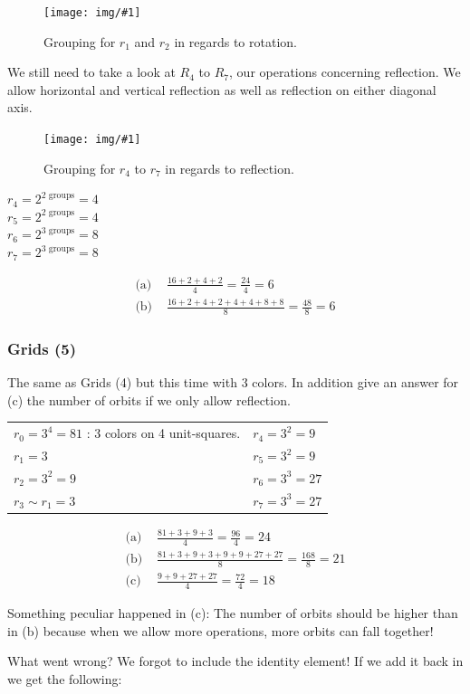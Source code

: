 \documentclass[12pt,onecolumn%
]{scrartcl}
\newcommand{\img}[3]{
\begin{figure}[H]
	\centering
	\texttt{[image: img/\#1]}
	\captionsetup{width=0.8\textwidth, justification=centering}
	\caption{#3}
\end{figure}
}
\newcommand{\eq}[1]{
\begin{equation*}
\begin{aligned}
#1
\end{aligned}
\end{equation*}
}
\begin{document}
{\img{block_2x2_groups_rot}{trim=140 530 245 130, clip}{Grouping for $r_1$ and $r_2$ in regards to rotation.}

We still need to take a look at $R_4$ to $R_7$, our operations concerning reflection. We allow horizontal and vertical reflection as well as reflection on either diagonal axis.

\img{block_2x2_groups_ref}{trim=140 440 235 120, clip}{Grouping for $r_4$ to $r_7$ in regards to reflection.}

$r_4 = 2^{2 \text{ groups}} = 4$ \\
$r_5 = 2^{2 \text{ groups}} = 4$ \\
$r_6 = 2^{3 \text{ groups}} = 8$ \\
$r_7 = 2^{3 \text{ groups}} = 8$

\eq{
	\text{(a) }& \frac{16+2+4+2}{4} = \frac{24}{4} = 6 \\
	\text{(b) }& \frac{16+2+4+2+4+4+8+8}{8} = \frac{48}{8} = 6
}

\subsubsection{Grids (5)}

The same as Grids (4) but this time with 3 colors. In addition give an answer for (c) the number of orbits if we only allow reflection.

\begin{center}
\begin{tabular}{l l}
$r_0 = 3^4 = 81$ : 3 colors on 4 unit-squares. & \qquad $r_4 = 3^{2} = 9$ \\
$r_1 = 3$ & \qquad $r_5 = 3^{2} = 9$ \\
$r_2 = 3^2 = 9$ & \qquad $r_6 = 3^{3} = 27$ \\
$r_3 \sim r_1 = 3$ & \qquad $r_7 = 3^{3} = 27$
\end{tabular}
\end{center}

\eq{
	\text{(a) }& \frac{81+3+9+3}{4} = \frac{96}{4} = 24 \\
	\text{(b) }& \frac{81+3+9+3+9+9+27+27}{8} = \frac{168}{8} = 21 \\
	\text{(c) }& \frac{9+9+27+27}{4} = \frac{72}{4} = 18
}

Something peculiar happened in (c): The number of orbits should be higher than in (b) because when we allow more operations, more orbits can fall together!

What went wrong? We forgot to include the identity element! If we add it back in we get the following:

}
\end{document}
